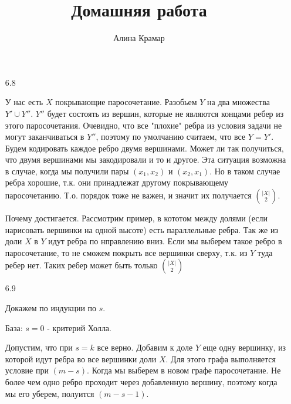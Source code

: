 \documentclass{article}
\begin{document}
\title{Домашняя работа}
\author{Алина Крамар}

\maketitle
\begin{enumerate}

\item[6.8]

У нас есть $X$ покрывающие паросочетание. Разобьем $Y$ на два множества $Y' \cup Y''$.
$Y''$ будет состоять из вершин, которые не являются концами ребер из этого паросочетания.
Очевидно, что все "плохие" ребра из условия задачи не могут заканчиваться в $Y''$,
поэтому по умолчанию считаем, что все $Y = Y'$. Будем кодировать каждое ребро двумя вершинами.
Может ли так получиться, что двумя вершинами мы закодировали и то и другое. Эта ситуация возможна в случае,
когда мы получили пары $(x_1, x_2)$ и $(x_2, x_1)$. Но в таком случае ребра хорошие, т.к. они принадлежат другому
покрывающему паросочетанию. Т.о. порядок тоже не важен, и значит их получается $\binom {|X|}2$.

Почему достигается. Рассмотрим пример, в кототом между долями (если нарисовать вершинки на одной высоте)
 есть параллельные ребра.
Так же из доли $X$ в $Y$ идут ребра по нправлению вниз. Если мы выберем такое ребро в паросочетание,
то не сможем покрыть все вершинки сверху, т.к. из $Y$ туда ребер нет. Таких ребер может быть только
$\binom {|X|}2$
\item[6.9]

Докажем по индукции по $s$.

База: $s = 0$ - критерий Холла.

Допустим, что при $s = k$ все верно. Добавим к доле $Y$ еще одну вершинку,
из которой идут ребра во все вершинки доли $X$. Для этого графа выполняется условие при $(m - s)$.
Когда мы выберем в новом графе паросочетание. Не более чем одно ребро проходит через добавленную вершину,
поэтому когда мы его уберем, полуится $(m - s - 1)$.
\end{enumerate}
\end{document}
